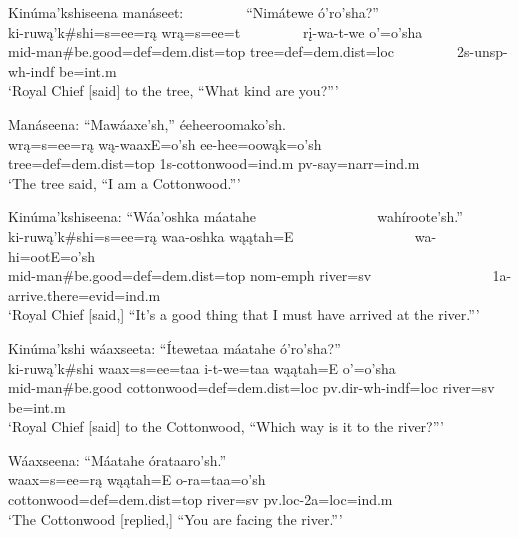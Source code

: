 \begin{exe}
\item\label{EJ92} \glll Kinúma'kshiseena manáseet: ~ ~ ~ ~ ~  ``Nimátewe ó'ro'sha?''\\
ki-ruwą'k\#shi=s=ee=rą wrą=s=ee=t ~ ~ ~ ~ ~ rį-wa-t-we o'=o'sha\\
mid-\textnormal{man}\#\textnormal{be.good}=def=dem.dist=top \textnormal{tree}=def=dem.dist=loc ~ ~ ~ ~ ~ 2s-unsp-wh-indf \textnormal{be}=int.m\\
\glt `Royal Chief [said] to the tree, ``What kind are you?{''}'

\item\label{EJ93} \glll Manáseena: ``Mawáaxe'sh,'' éeheeroomako'sh.\\
wrą=s=ee=rą wą-waaxE=o'sh ee-hee=oowąk=o'sh\\
\textnormal{tree}=def=dem.dist=top 1s-\textnormal{cottonwood}=ind.m pv-\textnormal{say}=narr=ind.m\\
\glt `The tree said, ``I am a Cottonwood.{''}'

\item\label{EJ94} \glll Kinúma'kshiseena: ``Wáa'oshka máatahe ~ ~ ~ ~ ~ ~ ~ ~ ~ ~ wahíroote'sh.''\\
ki-ruwą'k\#shi=s=ee=rą waa-oshka wąątah=E ~ ~ ~ ~ ~ ~ ~ ~ ~ ~ wa-hi=ootE=o'sh\\
mid-\textnormal{man}\#\textnormal{be.good}=def=dem.dist=top nom-emph \textnormal{river}=sv ~ ~ ~ ~ ~ ~ ~ ~ ~ ~ 1a-\textnormal{arrive.there}=evid=ind.m\\
\glt `Royal Chief [said,] ``It's a good thing that I must have arrived at the river.{''}'

\item\label{EJ95} \glll Kinúma'kshi wáaxseeta: ``Ítewetaa máatahe ó'ro'sha?''\\
ki-ruwą'k\#shi waax=s=ee=taa i-t-we=taa wąątah=E o'=o'sha\\
mid-\textnormal{man}\#\textnormal{be.good} \textnormal{cottonwood}=def=dem.dist=loc pv.dir-wh-indf=loc \textnormal{river}=sv \textnormal{be}=int.m\\
\glt `Royal Chief [said] to the Cottonwood, ``Which way is it to the river?{''}'

\item\label{EJ96} \glll Wáaxseena: ``Máatahe órataaro'sh.''\\
waax=s=ee=rą wąątah=E o-ra=taa=o'sh\\
\textnormal{cottonwood}=def=dem.dist=top \textnormal{river}=sv pv.loc-2a=loc=ind.m\\
\glt `The Cottonwood [replied,] ``You are facing the river.{''}'


\end{exe}
